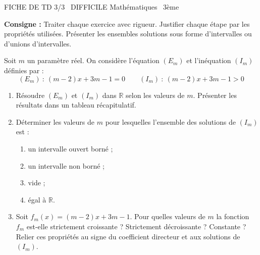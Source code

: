 \documentclass[11pt]{article}
\begin{document}
\begin{tcolorbox}[enhanced,colback=popink,colframe=popink,arc=10pt,boxrule=0pt,left=12pt,right=12pt,top=9pt,bottom=9pt]
{\color{white}\popxbold\small FICHE DE TD 3/3 \textbullet\ DIFFICILE \hfill Mathématiques \textbullet\ 3ème\par}
\end{tcolorbox}
\vspace{4pt}
\noindent\textbf{Consigne :} Traiter chaque exercice avec rigueur. Justifier chaque étape par les propriétés utilisées. Présenter les ensembles solutions sous forme d'intervalles ou d'unions d'intervalles.

\begin{exercice}
Soit $m$ un paramètre réel. On considère l'équation $(E_m)$ et l'inéquation $(I_m)$ définies par :
\[
(E_m)\ :\ (m-2)x + 3m - 1 = 0 \qquad
(I_m)\ :\ (m-2)x + 3m - 1 > 0
\]
\begin{enumerate}
    \item Résoudre $(E_m)$ et $(I_m)$ dans $\mathbb{R}$ selon les valeurs de $m$. Présenter les résultats dans un tableau récapitulatif.
    \item Déterminer les valeurs de $m$ pour lesquelles l'ensemble des solutions de $(I_m)$ est :
    \begin{enumerate}
        \item un intervalle ouvert borné ;
        \item un intervalle non borné ;
        \item vide ;
        \item égal à $\mathbb{R}$.
    \end{enumerate}
    \item Soit $f_m(x) = (m-2)x + 3m - 1$. Pour quelles valeurs de $m$ la fonction $f_m$ est-elle strictement croissante ? Strictement décroissante ? Constante ? Relier ces propriétés au signe du coefficient directeur et aux solutions de $(I_m)$.
\end{enumerate}
\end{exercice}
\end{document}
